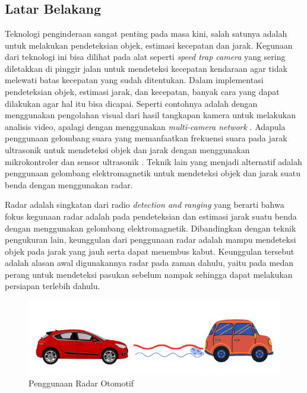 \chapter{\babSatu}
\section{Latar Belakang}
Teknologi penginderaan sangat penting pada masa kini, salah satunya adalah untuk melakukan pendeteksian objek, estimasi kecepatan dan jarak. Kegunaan dari teknologi ini bisa dilihat pada alat seperti \textit{speed trap camera} yang sering diletakkan di pinggir jalan untuk mendeteksi kecepatan kendaraan agar tidak melewati batas kecepatan yang sudah ditentukan. Dalam implementasi pendeteksian objek, estimasi jarak, dan kecepatan, banyak cara yang dapat dilakukan agar hal itu bisa dicapai. Seperti contohnya adalah dengan menggunakan pengolahan visual dari hasil tangkapan kamera untuk melakukan analisis video, apalagi dengan menggunakan \textit{multi-camera network} \cite{Zhang2015}. Adapula penggunaan gelombang suara yang memanfaatkan frekuensi suara pada jarak ultrasonik untuk mendeteksi objek dan jarak dengan menggunakan mikrokontroler dan sensor ultrasonik \cite{Biswas2020}. Teknik lain yang menjadi alternatif adalah penggunaan gelombang elektromagnetik untuk mendeteksi objek dan jarak suatu benda dengan menggunakan radar. 

Radar adalah singkatan dari radio \textit{detection and ranging} yang berarti bahwa fokus kegunaan radar adalah pada pendeteksian dan estimasi jarak suatu benda dengan menggunakan gelombang elektromagnetik. Dibandingkan dengan teknik pengukuran lain, keunggulan dari penggunaan radar adalah mampu mendeteksi objek pada jarak yang jauh serta dapat menembus kabut. Keunggulan tersebut adalah alasan awal digunakannya radar pada zaman dahulu, yaitu  pada medan perang untuk mendeteksi pasukan sebelum nampak sehingga dapat melakukan persiapan terlebih dahulu. 

\begin{figure}
	\begin{center}
		\includegraphics[scale=0.5]{pics/bab1/AplikasiRadar.png} 
		\caption[Penggunaan Radar Otomotif]{Penggunaan Radar Otomotif}
		\label{pic:aplikasiRadarKini}
	\end{center}
\end{figure}

